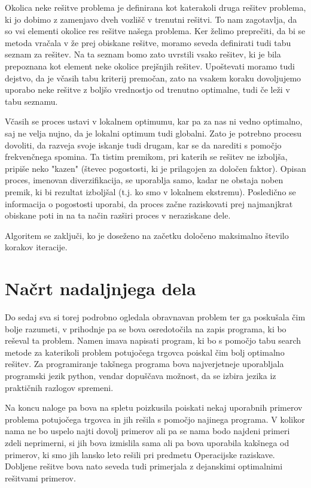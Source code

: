\documentclass[10pt, a4paper]{article}
\begin{document}
Okolica neke rešitve problema je definirana kot katerakoli druga rešitev problema, ki jo dobimo z zamenjavo dveh vozlišč v trenutni rešitvi. To nam zagotavlja, da so vsi elementi okolice res rešitve našega problema. Ker želimo preprečiti, da bi se metoda vračala v že prej obiskane rešitve, moramo seveda definirati tudi tabu seznam za rešitev. Na ta seznam bomo zato uvrstili vsako rešitev, ki je bila prepoznana kot element neke okolice prejšnjih rešitev. Upoštevati moramo tudi dejstvo, da je včasih tabu kriterij premočan, zato na vsakem koraku dovoljujemo uporabo neke rešitve z boljšo vrednostjo od trenutno optimalne, tudi če leži v tabu seznamu.

Včasih se proces ustavi v lokalnem optimumu, kar pa za nas ni vedno optimalno, saj ne velja nujno, da je lokalni optimum tudi globalni. Zato je potrebno procesu dovoliti, da razveja svoje iskanje tudi drugam, kar se da narediti s pomočjo frekvenčnega spomina. Ta tistim premikom, pri katerih se rešitev ne izboljša, pripiše neko "kazen" (števec pogostosti, ki je prilagojen za določen faktor). Opisan proces, imenovan diverzifikacija, se uporablja samo, kadar ne obstaja noben premik, ki bi rezultat izboljšal (t.j. ko smo v lokalnem ekstremu). Posledično se informacija o pogostosti uporabi, da proces začne raziskovati prej najmanjkrat obiskane poti in na ta način razširi proces v neraziskane dele.

Algoritem se zaključi, ko je doseženo na začetku določeno maksimalno število korakov iteracije.




\section{Načrt nadaljnjega dela}

Do sedaj sva si torej podrobno ogledala obravnavan problem ter ga poskušala čim bolje razumeti, v prihodnje pa se bova osredotočila na zapis programa, ki bo reševal ta problem. Namen imava napisati program, ki bo s pomočjo tabu search metode za katerikoli problem potujočega trgovca poiskal čim bolj optimalno rešitev. Za programiranje takšnega programa bova najverjetneje uporabljala programski jezik python, vendar dopuščava možnost, da se izbira jezika iz praktičnih razlogov spremeni.

Na koncu naloge pa bova na spletu poizkusila poiskati nekaj uporabnih primerov problema potujočega trgovca in jih rešila s pomočjo najinega programa. V kolikor nama ne bo uspelo najti dovolj primerov ali pa se nama bodo najdeni primeri zdeli neprimerni, si jih bova izmislila sama ali pa bova uporabila kakšnega od primerov, ki smo jih lansko leto rešili pri predmetu Operacijske raziskave. Dobljene rešitve bova nato seveda tudi primerjala z dejanskimi optimalnimi rešitvami primerov.
\end{document}
